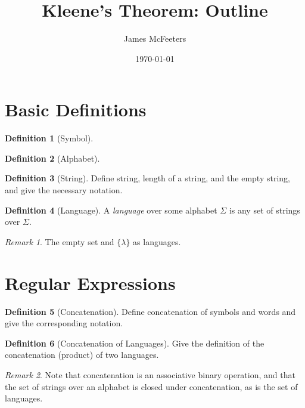 \documentclass[12 pt, twoside, letterpaper]{article}
\title{Kleene's Theorem: Outline}
\author{James McFeeters}
\date{\today}
\newcommand{\meo}[1]{\texttt{#1}}
\renewcommand{\meo}[1]{\iffalse #1 \fi}
\theoremstyle{definition}
\newtheorem{definition}{Definition}
\theoremstyle{remark}
\newtheorem*{remark}{Remark}
\theoremstyle{plain}
\begin{document}
\maketitle



\section{Basic Definitions} %
\label{sec:basic_definitions}

	\begin{definition}[Symbol]
		
	\end{definition}

	\begin{definition}[Alphabet]

	\end{definition}

	\begin{definition}[String]
		Define string, length of a string, and the empty string, and give the necessary notation.
	\end{definition}

	\begin{definition}[Language]
		A \textit{language} over some alphabet $\Sigma$ is any set of strings over $\Sigma$.
	\end{definition}

	\begin{remark}
		The empty set and $\{ \lambda \}$ as languages.
	\end{remark}

\section{Regular Expressions} %
\label{sec:regular_expressions}
	
	\begin{definition}[Concatenation]
		Define concatenation of symbols and words and give the corresponding notation.
		\meo{
			Make sure to include the notation $x^i$ and $x^0$.
		}
	\end{definition}

	\begin{definition}[Concatenation of Languages]
		Give the definition of the concatenation (product) of two languages.
	\end{definition}

	\begin{remark}
		Note that concatenation is an associative binary operation, and that the set of strings over an alphabet is closed under concatenation, as is the set of languages.
		\meo{
			Maybe also note that length has the properties of the logarithm with regard to concatenation.
			It's a curiosity, but not really useful information
		}
	\end{remark}
\end{document}
